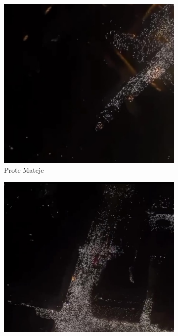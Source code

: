 \documentclass[a4paper,12pt]{article}
\begin{document}
\begin{figure}[H]
	\centering
  
	\begin{subfigure}[b]{0.3\textwidth}
	  \centering
	  \includegraphics[width=\textwidth]{../images/prote-mateje.jpeg}
	  \caption{Prote Mateje}
	  \label{fig:prote-mateje}
	\end{subfigure}
	\hfill
	\begin{subfigure}[b]{0.3\textwidth}
	  \centering
	  \includegraphics[width=\textwidth]{../images/nemanjina.jpeg}

\end{subfigure}
\end{figure}
\end{document}
